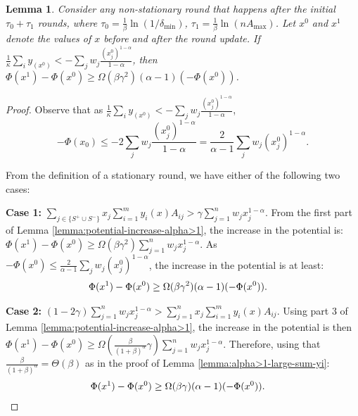 \documentclass[11pt]{article}
\newtheorem{lemma}[theorem]{Lemma}
\begin{document}
\begin{lemma}\label{lemma:alpha>1-mul-inc-non-stat}
Consider any non-stationary round that happens after the initial $\tau_0 + \tau_1$ rounds, where $\tau_0 = \frac{1}{\beta}\ln(1/\delta_{\min})$, $\tau_1 = \frac{1}{\beta}\ln(nA_{\max})$. Let $x^0$ and $x^1$ denote the values of $x$ before and after the round update. If $\frac{1}{\kappa}\sum_i y_(x^0) < -\sum_j w_j \frac{{(x_j^0)}^{1-\alpha}}{1-\alpha}$, then $\Phi(x^1) - \Phi(x^0) \geq \Omega\left(\beta\gamma^2\right)(\alpha-1)(-\Phi(x^0))$.
\end{lemma}
\begin{proof}
Observe that as $\frac{1}{\kappa}\sum_i y_(x^0) < -\sum_j w_j \frac{{(x_j^0)}^{1-\alpha}}{1-\alpha}$,
\begin{equation*}
-\Phi(x_0)\leq -2\sum_j w_j \frac{{(x_j^0)}^{1-\alpha}}{1-\alpha} = \frac{2}{\alpha-1} \sum_j w_j {{(x_j^0)}^{1-\alpha}}.
\end{equation*}

From the definition of a stationary round, we have either of the following two cases:

\noindent\textbf{Case 1:} $\sum_{j\in\{S^+\cup S^-\}}x_j\sum_{i=1}^m y_i(x)A_{ij}> \gamma \sum_{j=1}^n w_j x_j^{1-\alpha}$. 
From the first part of Lemma \ref{lemma:potential-increase-alpha>1}, the increase in the potential is: $\Phi(x^1) - \Phi(x^0) \geq \Omega\left(\beta\gamma^2\right)\sum_{j=1}^n w_j x_j^{1-\alpha}$. As $-\Phi(x^0)\leq \frac{2}{\alpha-1} \sum_j w_j {{(x_j^0)}^{1-\alpha}}$, the increase in the potential is at least:
\begin{align}
\Phi(x^1) - \Phi(x^0) &\geq \Omega(\beta\gamma^2)(\alpha-1)(-\Phi(x^0)).\notag \end{align}

\noindent\textbf{Case 2:} $(1-2\gamma)\sum_{j=1}^n w_j x_j^{1-\alpha} > \sum_{j=1}^n x_j\sum_{i=1}^m y_i(x)A_{ij}$. Using part 3 of Lemma \ref{lemma:potential-increase-alpha>1}, the increase in the potential is then $\Phi(x^1) - \Phi(x^0)\geq \Omega\left(\frac{\beta}{(1+\beta)^{\alpha}}\gamma\right)\sum_{j=1}^n w_j x_j^{1-\alpha}$. Therefore, using that $\frac{\beta}{(1+\beta)^{\alpha}} = \Theta(\beta)$ as in the proof of Lemma \ref{lemma:alpha>1-large-sum-yi}:
\begin{align}
\Phi(x^1) - \Phi(x^0) &\geq \Omega(\beta\gamma)(\alpha-1)(-\Phi(x^0)).\notag
\end{align}

\end{proof}
\end{document}

